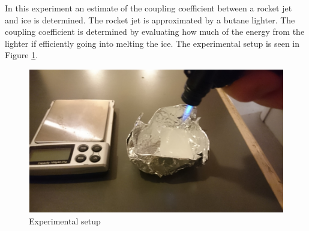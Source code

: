 \label{app:coupling}

In this experiment an estimate of the coupling coefficient between a rocket jet and ice is determined. The rocket jet is approximated by a butane lighter. The coupling coefficient is determined by evaluating how much of the energy from the lighter if efficiently going into melting the ice. The experimental setup is seen in Figure \ref{fig:coupling}.

\begin{figure}[htb]
\begin{center}
\includegraphics[scale=0.8]{figures/navtheory/coupling}
\caption{Experimental setup}
\label{fig:coupling}
\end{center}
\end{figure}

